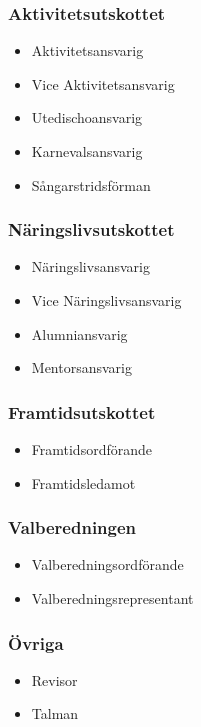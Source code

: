 \documentclass{dsekprotokoll}
\begin{document}
\begin{multicols}{2}
  \subsubsection*{Aktivitetsutskottet}
  \begin{itemize}
    \item Aktivitetsansvarig
    \item Vice Aktivitetsansvarig
    \item Utedischoansvarig
    \item Karnevalsansvarig
    \item Sångarstridsförman
  \end{itemize}
  \subsubsection*{Näringslivsutskottet}
  \begin{itemize}
    \item Näringslivsansvarig
    \item Vice Näringslivsansvarig
    \item Alumniansvarig
    \item Mentorsansvarig
  \end{itemize}
  \subsubsection*{Framtidsutskottet}
  \begin{itemize}
    \item Framtidsordförande
    \item Framtidsledamot
  \end{itemize}

  \subsubsection*{Valberedningen}
  \begin{itemize}
    \item Valberedningsordförande
    \item Valberedningsrepresentant
  \end{itemize}
  \subsubsection*{Övriga}
  \begin{itemize}
    \item Revisor
    \item Talman
  \end{itemize}

\end{multicols}
\end{document}

